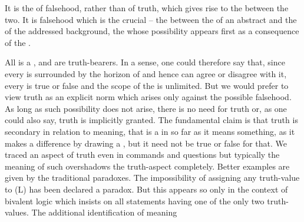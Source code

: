 %
It is the  of falsehood, rather than of truth, which
gives rise to the  between the two. It is falsehood which is the
crucial  -- the  between the  of an
abstract  and the  of the addressed background, the 
 whose possibility 
appears first as a consequence of the . 

All  is a , and  are
truth-bearers. In a sense, one could therefore say
that, since every 
 is surrounded by the horizon of  and hence can agree or
disagree with it, every  is true or false and the scope of the
 is unlimited. 
But we would prefer to view truth as an explicit norm which
arises only against the possible falsehood. As long as such possibility does not
arise, there is no need for truth or, as one could also say, truth is implicitly
granted. The fundamental claim is that truth is secondary in relation to
meaning, that  is a  in so far as it means something, as it
makes a difference by drawing a , but it need not be true or
false for that.  We
traced an aspect of truth even in commands and questions but typically the
meaning of such  overshadows the truth-aspect completely.
Better examples are
given by the traditional paradoxes. 
%
%
The impossibility of assigning any truth-value to (L) has been declared a
paradox. But this appears so only in the context of bivalent logic which insists
on all statements having one of the only two truth-values. The additional identification of meaning
